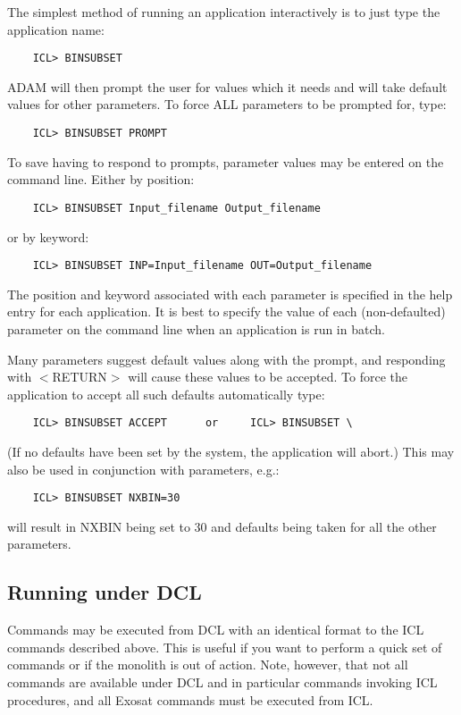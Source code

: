 The simplest method of running an application interactively is to just
type the application name:
\begin{verbatim}
    ICL> BINSUBSET
\end{verbatim}
ADAM will then prompt the user for values which it needs and will take default
values for other parameters. To force ALL parameters to be prompted for, type:
\begin{verbatim}
    ICL> BINSUBSET PROMPT
\end{verbatim}
To save having to respond to prompts, parameter values may be entered on the 
command line. Either by position:
\begin{verbatim}
    ICL> BINSUBSET Input_filename Output_filename
\end{verbatim}
or by keyword:
\begin{verbatim}
    ICL> BINSUBSET INP=Input_filename OUT=Output_filename
\end{verbatim}
The position and keyword associated with each parameter is specified in the
help entry for each application. It is best to specify the value of
each (non-defaulted) parameter on the
command line when an application is run in batch.

Many parameters suggest default values along with the prompt, and
responding with $<$RETURN$>$ will cause these values to be accepted.
To force the application to accept all such defaults automatically
type:
\begin{verbatim}
    ICL> BINSUBSET ACCEPT      or     ICL> BINSUBSET \
\end{verbatim}
(If no defaults have been set by the system, the application will abort.)
This may also be used in conjunction with parameters,  e.g.:
\begin{verbatim}
    ICL> BINSUBSET NXBIN=30 
\end{verbatim}
will result in NXBIN being set to 30 and defaults being taken for all
the other parameters.

\subsection{Running under DCL }

Commands may be executed from DCL with an identical format to the ICL commands
described above. This is useful if you want to perform a quick  set of commands
or if the monolith is out of action. Note, however,  that not all commands are
available under DCL and in particular commands invoking ICL procedures, and all
Exosat commands must be executed from ICL.

